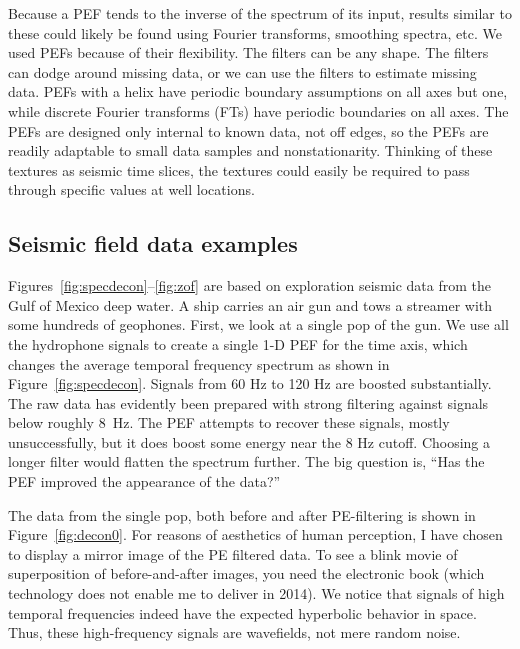 

\par
Because a PEF tends to the inverse of the spectrum of its input,
results similar to these could likely be found
using Fourier transforms, smoothing spectra, etc.
We used PEFs because of their flexibility.
The filters can be any shape.
The filters can dodge around missing data,
or we can use the filters to estimate missing data.
PEFs with a helix have periodic boundary assumptions
on all axes but one,
while discrete Fourier transforms (FTs)
have periodic boundaries on all axes.
The PEFs are designed only internal to known data, not off edges,
so the PEFs are readily adaptable to small data samples and nonstationarity.
Thinking of these textures as seismic time slices,
the textures could easily be required to pass through specific
values at well locations.  



\subsection{Seismic field data examples}
\par
Figures~\ref{fig:specdecon}--\ref{fig:zof}
are based on exploration seismic data from the Gulf of Mexico deep water.
A ship carries an air gun and tows a streamer with some hundreds of geophones.
First,
we look at a single pop of the gun.
We use all the hydrophone signals to create a single 1-D PEF for the time axis,
which changes the average temporal frequency spectrum
as shown in Figure~\ref{fig:specdecon}.
Signals from 60 Hz to 120 Hz are boosted substantially.
The raw data has evidently been prepared
with strong filtering against signals below roughly 8~Hz.
The PEF attempts to recover these signals, mostly unsuccessfully,
but it does boost some energy near the 8 Hz cutoff.
Choosing a longer filter would flatten the spectrum further.
The big question is, ``Has the PEF improved the appearance of the data?''

\par
The data from the single pop,
both before and after PE-filtering is shown in
Figure~\ref{fig:decon0}.
For reasons of aesthetics of human perception,
I have chosen to display a mirror image of the PE filtered data.
To see a blink movie of superposition of
before-and-after images, you need the electronic book
(which technology does not enable me to deliver in 2014).
We notice that signals of high temporal frequencies
indeed have the expected hyperbolic behavior in space.
Thus, these high-frequency signals are wavefields, not mere random noise.

